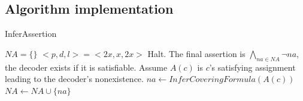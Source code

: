 \documentclass[journal]{IEEEtran}
\begin{document}
%
%

\subsection{Algorithm implementation}\label{subsec_algo}

\begin{algorithm}
\caption{InferAssertion}
\label{algo_pcln}
\begin{algorithmic}[1]
\STATE $NA=\{\}$
\STATE $<p,d,l>=<2x,x,2x>$
\label{algo_pcln_pdl}
\label{algo_pcln_pc}
\STATE Halt. The final assertion is $\bigwedge_{na\in NA}\neg na$, the decoder exists if it is satisfiable.
\ELSE
{}
\label{algo_pcln_lnc}
\STATE Assume $A(c)$ is $c$'s satisfying assignment leading to the decoder's nonexistence.
\label{algo_pcln_Ac}
\STATE $na\leftarrow InferCoveringFormula(A(c))$
\label{algo_pcln_nainfer}
\STATE $NA\leftarrow NA\cup \{na\}$
\label{algo_pcln_ruleout}
\ENDWHILE
\ENDIF
\ENDFOR
\end{algorithmic}
\end{algorithm}
\end{document}
